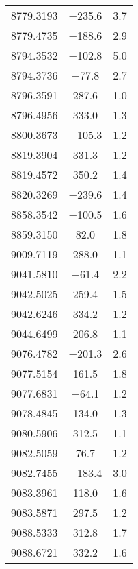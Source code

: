 \begin{table}[h!]
\begin{tabular}{ccc}
        8779.3193 & $-$235.6 & 3.7 \\ 
        8779.4735 & $-$188.6 & 2.9 \\ 
        8794.3532 & $-$102.8 & 5.0 \\ 
        8794.3736 & $-$77.8 & 2.7 \\ 
        8796.3591 & 287.6 & 1.0 \\ 
        8796.4956 & 333.0 & 1.3 \\ 
        8800.3673 & $-$105.3 & 1.2 \\ 
        8819.3904 & 331.3 & 1.2 \\ 
        8819.4572 & 350.2 & 1.4 \\ 
        8820.3269 & $-$239.6 & 1.4 \\ 
        8858.3542 & $-$100.5 & 1.6 \\ 
        8859.3150 & 82.0 & 1.8 \\ 
        9009.7119 & 288.0 & 1.1 \\ 
        9041.5810 & $-$61.4 & 2.2 \\ 
        9042.5025 & 259.4 & 1.5 \\ 
        9042.6246 & 334.2 & 1.2 \\ 
        9044.6499 & 206.8 & 1.1 \\ 
        9076.4782 & $-$201.3 & 2.6 \\ 
        9077.5154 & 161.5 & 1.8 \\ 
        9077.6831 & $-$64.1 & 1.2 \\ 
        9078.4845 & 134.0 & 1.3 \\ 
        9080.5906 & 312.5 & 1.1 \\ 
        9082.5059 & 76.7 & 1.2 \\ 
        9082.7455 & $-$183.4 & 3.0 \\ 
        9083.3961 & 118.0 & 1.6 \\ 
        9083.5871 & 297.5 & 1.2 \\ 
        9088.5333 & 312.8 & 1.7 \\ 
        9088.6721 & 332.2 & 1.6 \\ 
        \hline
    \end{tabular}
    \label{tab:WR155}
\end{table}
